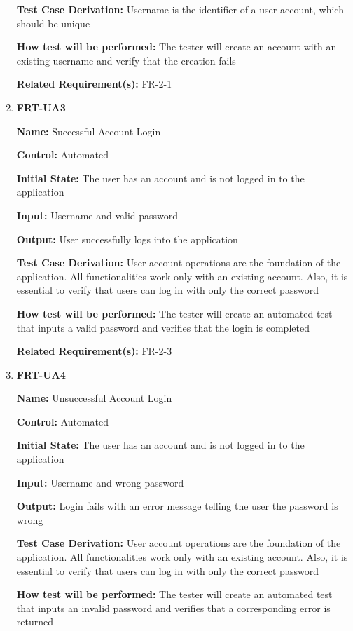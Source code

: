 \documentclass[12pt, titlepage]{article}
\begin{document}
\begin{enumerate}
\textbf{Test Case Derivation:} Username is the identifier of a user account, which should be unique
					
\textbf{How test will be performed:} The tester will create an account with an existing username and verify that the creation fails

\textbf{Related Requirement(s):} FR-2-1

\item{\textbf{FRT-UA3}}

\textbf{Name:} Successful Account Login

\textbf{Control:} Automated
					
\textbf{Initial State:} The user has an account and is not logged in to the application

\textbf{Input:} Username and valid password
					
\textbf{Output:} User successfully logs into the application

\textbf{Test Case Derivation:} User account operations are the foundation of the application. All functionalities work only with an existing account. Also, it is essential to verify that users can log in with only the correct password 
					
\textbf{How test will be performed:} The tester will create an automated test that inputs a valid password and verifies that the login is completed

\textbf{Related Requirement(s):} FR-2-3

\item{\textbf{FRT-UA4}}

\textbf{Name:} Unsuccessful Account Login

\textbf{Control:} Automated
					
\textbf{Initial State:} The user has an account and is not logged in to the application

\textbf{Input:} Username and wrong password
					
\textbf{Output:} Login fails with an error message telling the user the password is wrong

\textbf{Test Case Derivation:} User account operations are the foundation of the application. All functionalities work only with an existing account. Also, it is essential to verify that users can log in with only the correct password
					
\textbf{How test will be performed:} The tester will create an automated test that inputs an invalid password and verifies that a corresponding error is returned


\end{enumerate}
\end{document}
